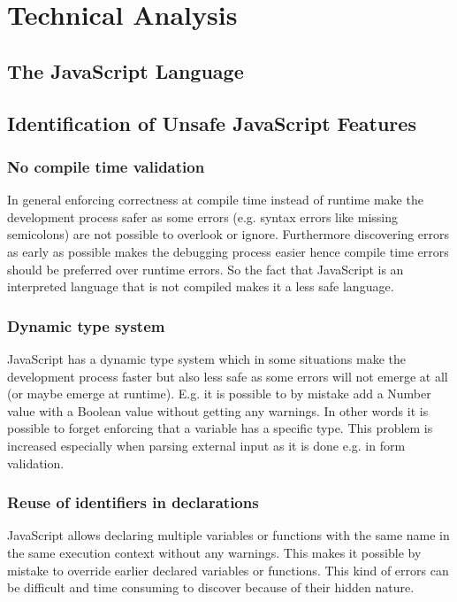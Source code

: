 \chapter{Technical Analysis}

\section{The JavaScript Language}

\section{Identification of Unsafe JavaScript Features}
	\subsection{No compile time validation}
		In general enforcing correctness at compile time instead of runtime make the development process safer as some errors (e.g. syntax errors like missing semicolons) are not possible to overlook or ignore. Furthermore discovering errors as early as possible makes the debugging process easier hence compile time errors should be preferred over runtime errors. So the fact that JavaScript is an interpreted language that is not compiled makes it a less safe language.

	\subsection{Dynamic type system}
		JavaScript has a dynamic type system which in some situations make the development process faster but also less safe as some errors will not emerge at all (or maybe emerge at runtime). E.g. it is possible to by mistake add a Number value with a Boolean value without getting any warnings. In other words it is possible to forget enforcing that a variable has a specific type. This problem is increased especially when parsing external input as it is done e.g. in form validation.
	
	\subsection{Reuse of identifiers in declarations}
		JavaScript allows declaring multiple variables or functions with the same name in the same execution context without any warnings. This makes it possible by mistake to override earlier declared variables or functions. This kind of errors can be difficult and time consuming to discover because of their hidden nature.

